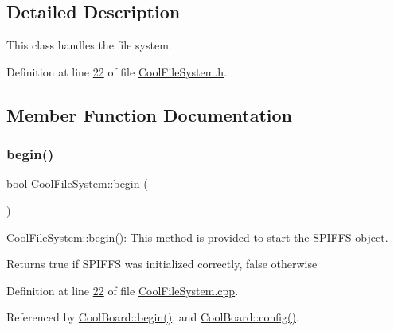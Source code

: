 \subsection{Detailed Description}
This class handles the file system. 

Definition at line \hyperlink{_cool_file_system_8h_source_l00022}{22} of file \hyperlink{_cool_file_system_8h_source}{Cool\+File\+System.\+h}.



\subsection{Member Function Documentation}
\mbox{\label{class_cool_file_system_a6ba6f666ed4c530174f8569d2c636748}} 
\subsubsection{\texorpdfstring{begin()}{begin()}}
{\footnotesize\ttfamily bool Cool\+File\+System\+::begin (\begin{DoxyParamCaption}{ }\end{DoxyParamCaption})}

\hyperlink{class_cool_file_system_a6ba6f666ed4c530174f8569d2c636748}{Cool\+File\+System\+::begin()}\+: This method is provided to start the S\+P\+I\+F\+FS object.

\begin{DoxyReturn}{Returns}
true if S\+P\+I\+F\+FS was initialized correctly, false otherwise 
\end{DoxyReturn}


Definition at line \hyperlink{_cool_file_system_8cpp_source_l00022}{22} of file \hyperlink{_cool_file_system_8cpp_source}{Cool\+File\+System.\+cpp}.



Referenced by \hyperlink{_cool_board_8cpp_source_l00021}{Cool\+Board\+::begin()}, and \hyperlink{_cool_board_8cpp_source_l00232}{Cool\+Board\+::config()}.


